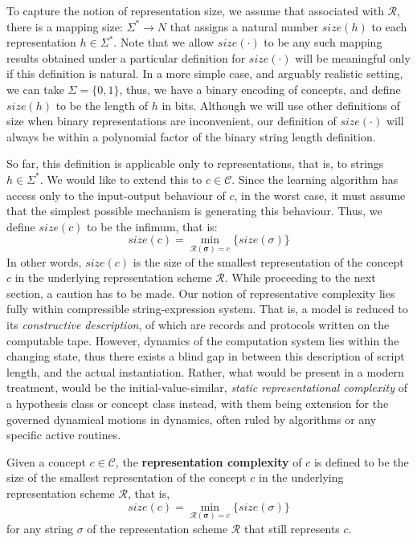 To capture the notion of representation size, we assume that associated with $\bm{\mathcal{R}}$, there is a mapping size: $\Sigma^{*}\to N$ that assigns a natural number $size(h)$ to each representation $h\in \Sigma^{*}$. Note that we allow $size(\cdot)$ to be any such mapping results obtained under a particular definition for $size(\cdot)$ will be meaningful only if this definition is natural. In a more simple case, and arguably realistic setting, we can take $\Sigma=\{0,1\}$, thus, we have a binary encoding of concepts, and define $size(h)$ to be the length of $h$ in bits. Although we will use other definitions of size when binary representations are inconvenient, our definition of $size(\cdot)$ will always be within a polynomial factor of the binary string length definition.

So far, this definition is applicable only to representations, that is, to strings $h\in \Sigma^{*}$. We would like to extend this to $c\in \mathcal{C}$. Since the learning algorithm has access only to the input-output behaviour of $c$, in the worst case, it must assume that the simplest possible mechanism is generating this behaviour. Thus, we define $size(c)$ to be the infimum, that is:  \begin{equation*}
    size(c) = \min_{\bm{\mathcal{R}(\sigma)}=c}\{size(\sigma)\}
\end{equation*}
In other words, $size(c)$ is the size of the smallest representation of the concept $c$ in the underlying representation scheme $\bm{\mathcal{R}}$. While proceeding to the next section, a caution has to be made. Our notion of representative complexity lies fully within compressible string-expression system. That is, a model is reduced to its \textit{constructive description}, of which are records and protocols written on the computable tape. However, dynamics of the computation system lies within the changing state, thus there exists a blind gap in between this description of script length, and the actual instantiation. Rather, what would be present in a modern treatment, would be the initial-value-similar, \textit{static representational complexity} of a hypothesis class or concept class instead, with them being extension for the governed dynamical motions in dynamics, often ruled by algorithms or any specific active routines. 
\begin{definition}
    Given a concept $c\in\mathcal{C}$, the \textbf{representation complexity} of $c$ is defined to be the size of the smallest representation of the concept $c$ in the underlying representation scheme $\bm{\mathcal{R}}$, that is, 
    \begin{equation*}
    size(c) = \min_{\bm{\mathcal{R}(\sigma)}=c}\{size(\sigma)\}
\end{equation*}
for any string $\sigma$ of the representation scheme $\bm{\mathcal{R}}$ that still represents $c$.
\end{definition}
